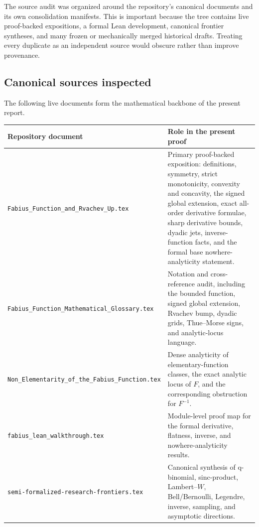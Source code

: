 \documentclass[11pt,oneside]{article}
\theoremstyle{definition}
\theoremstyle{remark}
\begin{document}
The source audit was organized around the repository's canonical documents and its
own consolidation manifests.  This is important because the tree contains live
proof-backed expositions, a formal Lean development, canonical frontier syntheses,
and many frozen or mechanically merged historical drafts.  Treating every duplicate
as an independent source would obscure rather than improve provenance.

\subsection{Canonical sources inspected}

The following live documents form the mathematical backbone of the present report.
\begin{longtable}{@{}p{}p{}@{}}
\toprule
Repository document & Role in the present proof \\
\midrule
\endhead
\texttt{Fabius\_Function\_and\_}\newline\texttt{Rvachev\_Up.tex}
& Primary proof-backed exposition: definitions, symmetry, strict monotonicity,
convexity and concavity, the signed global extension, exact all-order derivative
formulae, sharp derivative bounds, dyadic jets, inverse-function facts, and the
formal base nowhere-analyticity statement.\\[0.4em]
\texttt{Fabius\_Function\_}\newline\texttt{Mathematical\_}\newline\texttt{Glossary.tex}
& Notation and cross-reference audit, including the bounded function, signed global
extension, Rvachev bump, dyadic grids, Thue--Morse signs, and analytic-locus language.\\[0.4em]
\texttt{Non\_Elementarity\_}\newline\texttt{of\_the\_Fabius\_}\newline\texttt{Function.tex}
& Dense analyticity of elementary-function classes, the exact analytic locus of $F$,
and the corresponding obstruction for $F^{-1}$.\\[0.4em]
\texttt{fabius\_lean\_}\newline\texttt{walkthrough.tex}
& Module-level proof map for the formal derivative, flatness, inverse, and
nowhere-analyticity results.\\[0.4em]
\texttt{semi-formalized-}\newline\texttt{research-frontiers.tex}
& Canonical synthesis of q-binomial, sinc-product, Lambert--$W$, Bell/Bernoulli,
Legendre, inverse, sampling, and asymptotic directions.\\[0.4em]
\bottomrule
\end{longtable}
\end{document}
